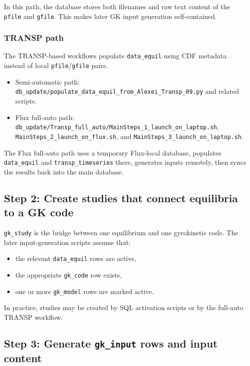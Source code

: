 \documentclass[11pt]{article}
\newcommand{\code}[1]{\texttt{#1}}
\begin{document}
In this path, the database stores both filenames and raw text content of the
\code{pfile} and \code{gfile}. This makes later GK input generation
self-contained.

\subsubsection{TRANSP path}

The TRANSP-based workflows populate \code{data\_equil} using CDF metadata
instead of local \code{pfile}/\code{gfile} pairs.

\begin{itemize}
\item Semi-automatic path: \code{db\_update/populate\_data\_equil\_from\_Alexei\_Transp\_09.py}
and related scripts.
\item Flux full-auto path: \code{db\_update/Transp\_full\_auto/MainSteps\_1\_launch\_on\_laptop.sh},
\code{MainSteps\_2\_launch\_on\_flux.sh}, and
\code{MainSteps\_3\_launch\_on\_laptop.sh}.
\end{itemize}

The Flux full-auto path uses a temporary Flux-local database, populates
\code{data\_equil} and \code{transp\_timeseries} there, generates inputs
remotely, then syncs the results back into the main database.

\subsection{Step 2: Create studies that connect equilibria to a GK code}

\code{gk\_study} is the bridge between one equilibrium and one gyrokinetic
code. The later input-generation scripts assume that:

\begin{itemize}
\item the relevant \code{data\_equil} rows are active,
\item the appropriate \code{gk\_code} row exists,
\item one or more \code{gk\_model} rows are marked active.
\end{itemize}

In practice, studies may be created by SQL activation scripts or by the
full-auto TRANSP workflow.

\subsection{Step 3: Generate \code{gk\_input} rows and input content}
\end{document}
